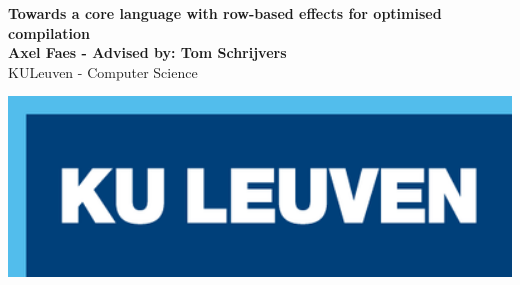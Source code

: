 \documentclass[a0,portrait]{a0poster}
\begin{document}

\begin{minipage}[b]{0.70\linewidth}
\veryHuge \color{NavyBlue} \textbf{Towards a core language with row-based effects for optimised compilation} \color{Black}\\ %
\huge \textbf{Axel Faes - Advised by: Tom Schrijvers}\\[0.5cm] %
\huge KULeuven - Computer Science\\[0.4cm] %
\end{minipage}
%
\begin{minipage}[b]{0.30\linewidth}
\includegraphics[width=20cm]{logo.png}\\
\end{minipage}

\vspace{1cm} %

\end{document}
